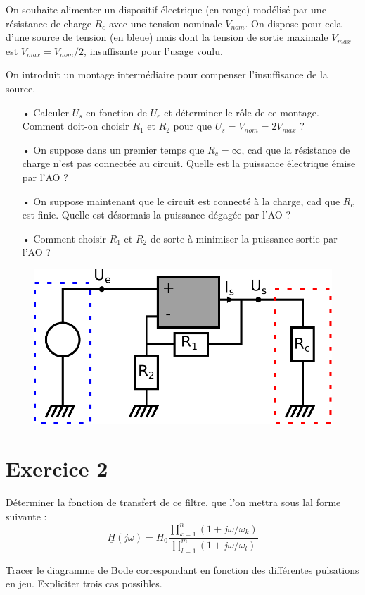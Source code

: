 \documentclass{report}
\begin{document}
On souhaite alimenter un dispositif électrique (en rouge) modélisé par une résistance de charge $R_c$ avec une tension nominale $V_{nom}$. On dispose pour cela d'une source de tension (en bleue) mais dont la tension de sortie maximale $V_{max}$ est $V_{max} = V_{nom}/2$, insuffisante pour l'usage voulu.

On introduit un montage intermédiaire pour compenser l'insuffisance de la source. 

\begin{itemize}
	\item[•] Calculer $U_s$ en fonction de $U_e$ et déterminer le rôle de ce montage. Comment doit-on choisir $R_1$ et $R_2$ pour que $U_s = V_{nom}=2V_{max}$ ?
	\item[•]  On suppose dans un premier temps que $R_c=\infty$, cad que la résistance de charge n'est pas connectée au circuit. Quelle est la puissance électrique émise par l'AO ?
	\item[•] On suppose maintenant que le circuit est connecté à la charge, cad que $R_c$ est finie. Quelle est désormais la puissance dégagée par l'AO ?
	\item[•] Comment choisir $R_1$ et $R_2$ de sorte à minimiser la puissance sortie par l'AO ?
\end{itemize}

\begin{figure}[!h]
\centering
\includegraphics[width=0.5\linewidth]{puissance_AO.pdf}
\end{figure}

\newpage

\section*{Exercice 2}
Déterminer la fonction de transfert de ce filtre, que l'on mettra sous lal forme suivante : 
\begin{equation}
\underline{H}(j\omega) = H_{0}\frac{\prod_{k=1}^{n} (1+j\omega/\omega_{k})}{\prod_{l=1}^{m} (1+j\omega/\omega_{l})}
\end{equation} 

Tracer le diagramme de Bode correspondant en fonction des différentes pulsations en jeu. Expliciter trois cas possibles.
\end{document}
